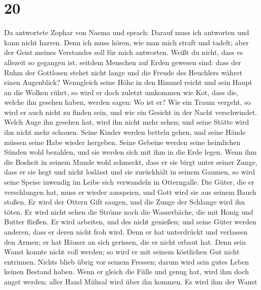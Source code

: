 \hypertarget{section-19}{%
\section{20}\label{section-19}}

 Da antwortete Zophar von Naema und sprach: 
Darauf muss ich antworten und kann nicht harren.  Denn ich
muss hören, wie man mich straft und tadelt; aber der Geist meines
Verstandes soll für mich antworten.  Weißt du nicht, dass
es allezeit so gegangen ist, seitdem Menschen auf Erden gewesen sind:
 dass der Ruhm der Gottlosen stehet nicht lange und die
Freude des Heuchlers währet einen Augenblick?  Wenngleich
seine Höhe in den Himmel reicht und sein Haupt an die Wolken rührt,
 so wird er doch zuletzt umkommen wie Kot, dass die,
welche ihn gesehen haben, werden sagen: Wo ist er?  Wie
ein Traum vergeht, so wird er auch nicht zu finden sein, und wie ein
Gesicht in der Nacht verschwindet.  Welch Auge ihn gesehen
hat, wird ihn nicht mehr sehen; und seine Stätte wird ihn nicht mehr
schauen.  Seine Kinder werden betteln gehen, und seine
Hände müssen seine Habe wieder hergeben.  Seine Gebeine
werden seine heimlichen Sünden wohl bezahlen, und sie werden sich mit
ihm in die Erde legen.  Wenn ihm die Bosheit in seinem
Munde wohl schmeckt, dass er sie birgt unter seiner Zunge,
 dass er sie hegt und nicht loslässt und sie zurückhält
in seinem Gaumen,  so wird seine Speise inwendig im Leibe
sich verwandeln in Otterngalle.  Die Güter, die er
verschlungen hat, muss er wieder ausspeien, und Gott wird sie aus seinem
Bauch stoßen.  Er wird der Ottern Gift saugen, und die
Zunge der Schlange wird ihn töten.  Er wird nicht sehen
die Ströme noch die Wasserbäche, die mit Honig und Butter fließen.
 Er wird arbeiten, und des nicht genießen; und seine
Güter werden anderen, dass er deren nicht froh wird. 
Denn er hat unterdrückt und verlassen den Armen; er hat Häuser an sich
gerissen, die er nicht erbaut hat.  Denn sein Wanst
konnte nicht voll werden; so wird er mit seinem köstlichen Gut nicht
entrinnen.  Nichts blieb übrig vor seinem Fressen; darum
wird sein gutes Leben keinen Bestand haben.  Wenn er
gleich die Fülle und genug hat, wird ihm doch angst werden; aller Hand
Mühsal wird über ihn kommen.  Es wird ihm der Wanst
